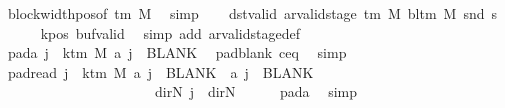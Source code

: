 \begin{isabellebody}
\ block{\isacharunderscore}{\kern0pt}width{\isacharunderscore}{\kern0pt}pos{\isacharbrackleft}{\kern0pt}of\ {\isachardoublequoteopen}{\isasymGamma}{\isacharunderscore}{\kern0pt}tm\ M{\isachardoublequoteclose}{\isacharbrackright}{\kern0pt}\ \isamarkupfalse%
\ simp\isanewline
\ \ \isamarkupfalse%
\ dst{\isacharunderscore}{\kern0pt}valid{\isacharcolon}{\kern0pt}\ {\isachardoublequoteopen}ar{\isacharunderscore}{\kern0pt}valid{\isacharunderscore}{\kern0pt}stage\ {\isacharparenleft}{\kern0pt}{\isasymGamma}{\isacharunderscore}{\kern0pt}tm\ M{\isacharparenright}{\kern0pt}\ {\isacharparenleft}{\kern0pt}bl{\isacharunderscore}{\kern0pt}tm\ M{\isacharparenright}{\kern0pt}\ {\isacharparenleft}{\kern0pt}snd\ {\isacharquery}{\kern0pt}s{\isacharprime}{\kern0pt}{\isacharparenright}{\kern0pt}{\isachardoublequoteclose}\isanewline
\ \ \ \ \isamarkupfalse%
\ kpos\ buf{\isacharunderscore}{\kern0pt}valid\ \isamarkupfalse%
\ {\isacharparenleft}{\kern0pt}simp\ add{\isacharcolon}{\kern0pt}\ ar{\isacharunderscore}{\kern0pt}valid{\isacharunderscore}{\kern0pt}stage{\isacharunderscore}{\kern0pt}def{\isacharparenright}{\kern0pt}\isanewline
\ \ \isamarkupfalse%
\ pad{\isacharunderscore}{\kern0pt}a{\isacharcolon}{\kern0pt}\ {\isachardoublequoteopen}{\isasymforall}j\ {\isasymge}\ k{\isacharunderscore}{\kern0pt}tm\ M{\isachardot}{\kern0pt}\ {\isacharquery}{\kern0pt}a\ j\ {\isacharequal}{\kern0pt}\ BLANK{}{\isachardoublequoteclose}\ \isamarkupfalse%
\ pad{\isacharunderscore}{\kern0pt}blank\ c{\isacharprime}{\kern0pt}{\isacharunderscore}{\kern0pt}eq\ \isamarkupfalse%
\ simp\isanewline
\ \ \isamarkupfalse%
\ pad{\isacharunderscore}{\kern0pt}read{\isacharcolon}{\kern0pt}\ {\isachardoublequoteopen}{\isasymforall}j\ {\isasymge}\ k{\isacharunderscore}{\kern0pt}tm\ M{\isachardot}{\kern0pt}\ {\isacharquery}{\kern0pt}a\ j\ {\isacharequal}{\kern0pt}\ BLANK{}\ {\isasymand}\ {\isacharquery}{\kern0pt}a\ j\ {\isacharequal}{\kern0pt}\ BLANK{}\isanewline
\ \ \ \ \ \ \ \ \ \ \ \ \ \ \ \ \ \ \ \ {\isasymand}\ {\isacharparenleft}{\kern0pt}{\isasymlambda}{\isacharunderscore}{\kern0pt}{\isachardot}{\kern0pt}\ dir{\isachardot}{\kern0pt}N{\isacharparenright}{\kern0pt}\ j\ {\isacharequal}{\kern0pt}\ dir{\isachardot}{\kern0pt}N{\isachardoublequoteclose}\isanewline
\ \ \ \ \isamarkupfalse%
\ pad{\isacharunderscore}{\kern0pt}a\ \isamarkupfalse%
\ simp\isanewline
\ \ \isamarkupfalse%

\end{isabellebody}
